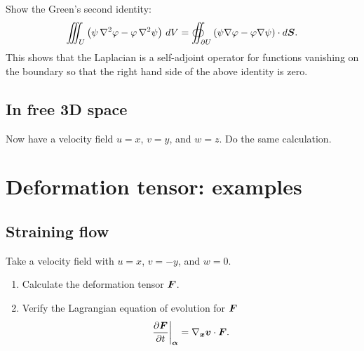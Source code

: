 \documentclass[11pt,letterpaper]{report}
\begin{document}
\subsection{}
Show the Green's second identity:
\begin{align}
    \iiint_U \left( \psi \, \nabla^2 \varphi - \varphi \, \nabla^2 \psi\right)\, dV = \oiint_{\partial U} \left( \psi \nabla \varphi - \varphi \nabla \psi\right)\cdot d\boldsymbol{S}.
\end{align}
This shows that the Laplacian is a self-adjoint operator for functions vanishing on the boundary so that the right hand side of the above identity is zero.



\subsection{In free 3D space}
Now have a velocity field $u=x$, $v=y$, and $w=z$. Do the same calculation.

\section{Deformation tensor: examples}
\subsection{Straining flow}
Take a velocity field with $u=x$, $v=-y$, and $w=0$. 
\begin{enumerate}
    \item Calculate the deformation tensor $\boldsymbol{F}$.
    \item Verify the Lagrangian equation of evolution for $\boldsymbol{F}$
        \begin{align}
            \left.\frac{\partial\boldsymbol{F}}{\partial t}\right|_{\boldsymbol{\alpha}} = \nabla_{\boldsymbol{x}}\boldsymbol{v}\cdot \boldsymbol{F}.
        \end{align}
\end{enumerate}
\end{document}
